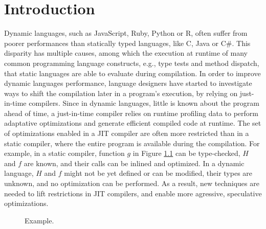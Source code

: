 
\chapter{Introduction} %

\label{Chapter1} %


\newcommand{\keyword}[1]{\textbf{#1}}
\newcommand{\tabhead}[1]{\textbf{#1}}
\newcommand{\code}[1]{\texttt{#1}}
\newcommand{\file}[1]{\texttt{\bfseries#1}}
\newcommand{\option}[1]{\texttt{\itshape#1}}


Dynamic languages, such as JavaScript, Ruby, Python or R, often suffer from poorer performances than statically typed languages, like C, Java or C\#.
This disparity has multiple causes, among which the execution at runtime of many common programming language constructs, e.g., type tests and method dispatch, that static languages are able to evaluate during compilation.
In order to improve dynamic languages performance, language designers have started to investigate ways to shift the compilation later in a program's execution, by relying on just-in-time compilers.
Since in dynamic languages, little is known about the program ahead of time, a just-in-time compiler relies on runtime profiling data to perform adaptative optimizations and generate efficient compiled code at runtime.
The set of optimizations enabled in a JIT compiler are often more restricted than in a static compiler, where the entire program is available during the compilation.
For example, in a static compiler, function $g$ in Figure \ref{fig:example} can be type-checked, $H$ and $f$ are known, and their calls can be inlined and optimized.
In a dynamic language, $H$ and $f$ might not be yet defined or can be modified, their types are unknown, and no optimization can be performed.
As a result, new techniques are needed to lift restrictions in JIT compilers, and enable more agressive, speculative optimizations.\\

\begin{figure}[h]
\caption{Example.}
\label{fig:example}
\end{figure}

